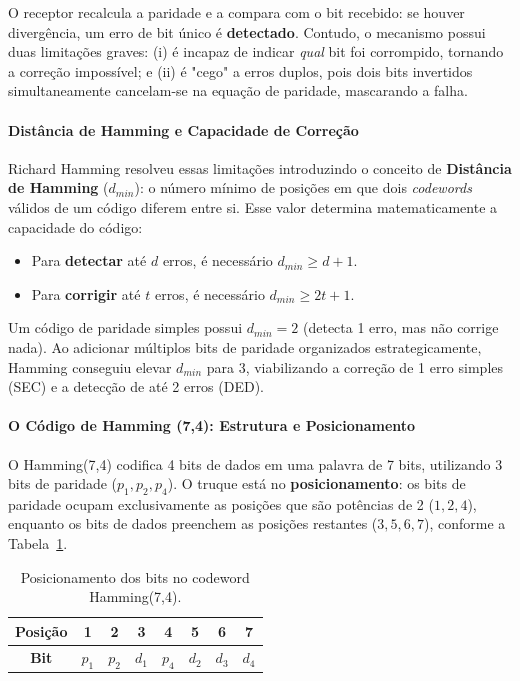 \documentclass[12pt,a4paper]{article}
\begin{document}
O receptor recalcula a paridade e a compara com o bit recebido: se houver 
divergência, um erro de bit único é \textbf{detectado}. Contudo, o mecanismo 
possui duas limitações graves: (i) é incapaz de indicar \textit{qual} bit 
foi corrompido, tornando a correção impossível; e (ii) é "cego" a erros 
duplos, pois dois bits invertidos simultaneamente cancelam-se na equação de 
paridade, mascarando a falha.

\paragraph{Distância de Hamming e Capacidade de Correção}
Richard Hamming resolveu essas limitações introduzindo o conceito de 
\textbf{Distância de Hamming} ($d_{min}$): o número mínimo de posições em 
que dois \textit{codewords} válidos de um código diferem entre si. Esse 
valor determina matematicamente a capacidade do código:

\begin{itemize}
    \item Para \textbf{detectar} até $d$ erros, é necessário $d_{min} \ge d+1$.
    \item Para \textbf{corrigir} até $t$ erros, é necessário $d_{min} \ge 2t+1$.
\end{itemize}

Um código de paridade simples possui $d_{min}=2$ (detecta 1 erro, mas não 
corrige nada). Ao adicionar múltiplos bits de paridade organizados 
estrategicamente, Hamming conseguiu elevar $d_{min}$ para 3, viabilizando 
a correção de 1 erro simples (SEC) e a detecção de até 2 erros (DED).

\paragraph{O Código de Hamming (7,4): Estrutura e Posicionamento}
O Hamming(7,4) codifica 4 bits de dados em uma palavra de 7 bits, utilizando 
3 bits de paridade ($p_1, p_2, p_4$). O truque está no \textbf{posicionamento}: 
os bits de paridade ocupam exclusivamente as posições que são potências de 
2 ($1, 2, 4$), enquanto os bits de dados preenchem as posições restantes 
($3, 5, 6, 7$), conforme a Tabela~\ref{tab:hamming_posicoes}.

\begin{table}[htpb]
\centering
\caption{Posicionamento dos bits no codeword Hamming(7,4).}
\label{tab:hamming_posicoes}
\begin{tabular}{cccccccc}
\toprule
\textbf{Posição} & 1 & 2 & 3 & 4 & 5 & 6 & 7 \\
\midrule
\textbf{Bit} & $p_1$ & $p_2$ & $d_1$ & $p_4$ & $d_2$ & $d_3$ & $d_4$ \\
\bottomrule
\end{tabular}
\end{table}
\end{document}
